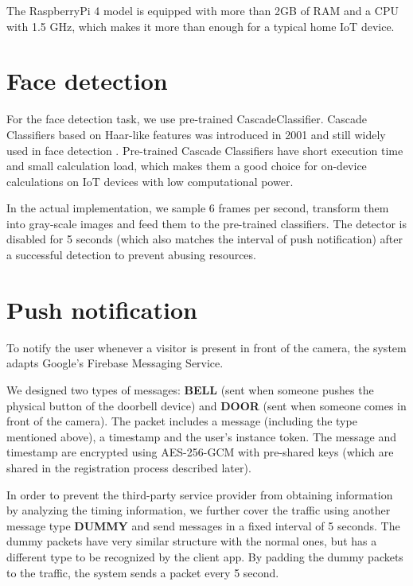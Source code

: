 The RaspberryPi 4 model is equipped with more than 2GB of RAM and a CPU with 1.5 GHz, which makes it more than enough for a typical home IoT device.

\section{Face detection}

For the face detection task, we use pre-trained CascadeClassifier. Cascade Classifiers based on Haar-like features was introduced in 2001 and still widely used in face detection \cite{sharifara2014general}. Pre-trained Cascade Classifiers have short execution time and small calculation load, which makes them a good choice for on-device calculations on IoT devices with low computational power.

In the actual implementation, we sample 6 frames per second, transform them into gray-scale images and feed them to the pre-trained classifiers. The detector is disabled for 5 seconds (which also matches the interval of push notification) after a successful detection to prevent abusing resources.

\section{Push notification}
To notify the user whenever a visitor is present in front of the camera, the system adapts Google's Firebase Messaging Service.

We designed two types of messages: \textbf{BELL} (sent when someone pushes the physical button of the doorbell device) and \textbf{DOOR} (sent when someone comes in front of the camera). The packet includes a message (including the type mentioned above), a timestamp and the user's instance token. The message and timestamp are encrypted using AES-256-GCM with pre-shared keys (which are shared in the registration process described later).

In order to prevent the third-party service provider from obtaining information by analyzing the timing information, we further cover the traffic using another message type \textbf{DUMMY} and send messages in a fixed interval of 5 seconds. The dummy packets have very similar structure with the normal ones, but has a different type to be recognized by the client app. By padding the dummy packets to the traffic, the system sends a packet every 5 second.






